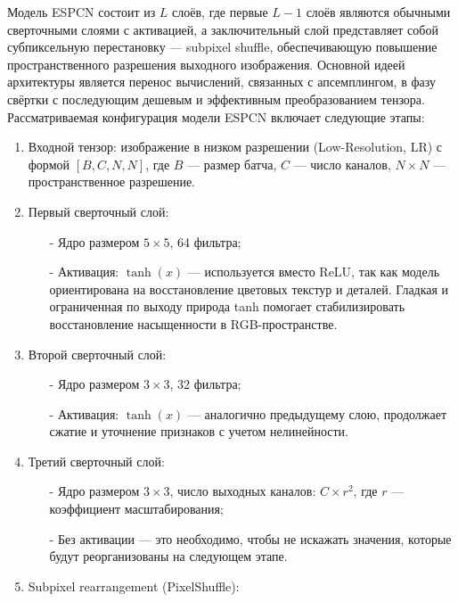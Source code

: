 \documentclass[a4paper,14pt]{extreport}
\begin{document}
        Модель ESPCN состоит из $L$ слоёв, где первые $L-1$ слоёв являются обычными сверточными слоями с активацией, а заключительный слой представляет собой субпиксельную перестановку — subpixel shuffle, обеспечивающую повышение пространственного разрешения выходного изображения. Основной идеей архитектуры является перенос вычислений, связанных с апсемплингом, в фазу свёртки с последующим дешевым и эффективным преобразованием тензора. Рассматриваемая конфигурация модели ESPCN включает следующие этапы:
        \begin{enumerate}
            \item Входной тензор: изображение в низком разрешении (Low-Resolution, LR) с формой $[B, C, N, N]$, где $B$ — размер батча, $C$ — число каналов, $N \times N$ — пространственное разрешение.
            \item Первый сверточный слой:
                \begin{itemize}
                    \item[-] Ядро размером $5 \times 5$, 64 фильтра;
                    \item[-] Активация: $\tanh(x)$ — используется вместо ReLU, так как модель ориентирована на восстановление цветовых текстур и деталей. Гладкая и ограниченная по выходу природа tanh помогает стабилизировать восстановление насыщенности в RGB-пространстве.
                \end{itemize}
            \item Второй сверточный слой:
                \begin{itemize}
                    \item[-] Ядро размером $3 \times 3$, 32 фильтра;
                    \item[-] Активация: $\tanh(x)$ — аналогично предыдущему слою, продолжает сжатие и уточнение признаков с учетом нелинейности.
                \end{itemize}
            \item Третий сверточный слой:
                \begin{itemize}
                    \item[-] Ядро размером $3 \times 3$, число выходных каналов: $C \times r^2$, где $r$ — коэффициент масштабирования;
                    \item[-] Без активации — это необходимо, чтобы не искажать значения, которые будут реорганизованы на следующем этапе.
                \end{itemize}
            \item Subpixel rearrangement (PixelShuffle):

\end{enumerate}
\end{document}
